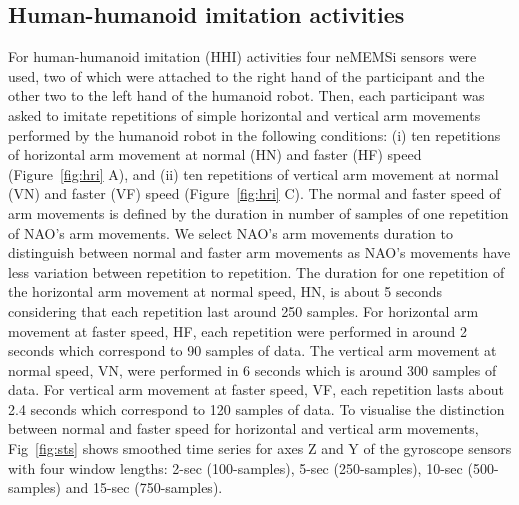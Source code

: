 \documentclass[fleqn,10pt]{wlscirep}
\begin{document}
\subsection*{Human-humanoid imitation activities}
For human-humanoid imitation (HHI) activities four neMEMSi sensors were used,
two of which were attached to the right hand of the participant and the 
other two to the left hand of the humanoid robot.
Then, each participant was asked to imitate repetitions of simple horizontal
and vertical arm movements performed by the humanoid robot in the following 
conditions:
(i) ten repetitions of horizontal arm movement at normal (HN) 
	and faster (HF) speed (Figure~\ref{fig:hri} A), and
(ii) ten repetitions of vertical arm movement at normal (VN) 
	and faster (VF) speed (Figure~\ref{fig:hri} C).
The normal and faster speed of arm movements is defined by the duration 
in number of samples of one repetition of NAO's arm movements. 
We select NAO's arm movements duration to distinguish between normal and 
faster arm movements as NAO's movements have less variation between 
repetition to repetition. The duration for one repetition of the horizontal 
arm movement at normal speed, HN, is about 5 seconds considering 
that each repetition last around 250 samples.
For horizontal arm movement at faster speed, HF, each repetition were performed 
in around 2 seconds which correspond to 90 samples of data.
The vertical arm movement at normal speed, VN, were performed  in 6 seconds 
which is around 300 samples of data. For vertical arm movement at 
faster speed, VF, each repetition lasts about 2.4 seconds which correspond 
to 120 samples of data.
To visualise the distinction between normal and faster speed for horizontal 
and vertical arm movements, Fig~\ref{fig:sts} shows smoothed time series 
for axes Z and Y of the gyroscope sensors with four window lengths: 
2-sec (100-samples), 5-sec (250-samples), 10-sec (500-samples) 
and 15-sec (750-samples).
\end{document}
